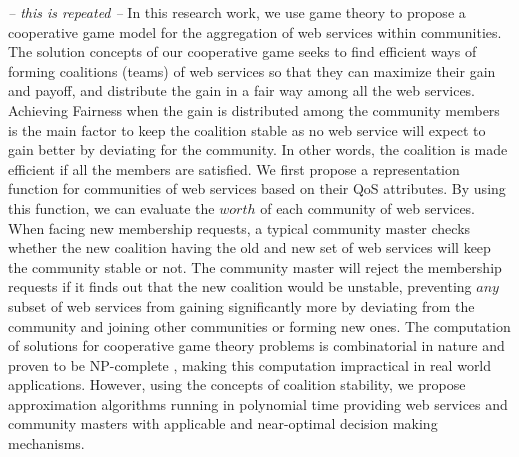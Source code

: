         \emph {-- this is repeated --}
        In this research work, we use game theory to
        propose a cooperative game model for the aggregation of web
        services within communities. The solution concepts of our
        cooperative game seeks to find efficient ways of forming
        coalitions (teams) of web services so that they can maximize their
        gain and payoff, and distribute the gain in a fair way among all
        the web services. Achieving Fairness when the gain is distributed
        among the community members is the main factor to keep the
        coalition stable as no web service will expect to gain better by
        deviating for the community. In other words, the coalition is made
        efficient if all the members are satisfied. We first propose a
        representation function for communities of web services based on
        their QoS attributes. By using this function, we can evaluate the
        $worth$ of each community of web services. When facing new
        membership requests, a typical community master checks whether the
        new coalition having the old and new set of web services will keep
        the community stable or not. The community master will reject the
        membership requests if it finds out that the new coalition would
        be unstable, preventing $any$ subset of web services from gaining
        significantly more by deviating from the community and joining
        other communities or forming new ones. The computation of
        solutions for cooperative game theory problems is combinatorial in
        nature and proven to be NP-complete \cite{Algorithmic}, making
        this computation impractical in real world applications. However,
        using the concepts of coalition stability, we propose
        approximation algorithms running in polynomial time providing web
        services and community masters with applicable and near-optimal
        decision making mechanisms.




